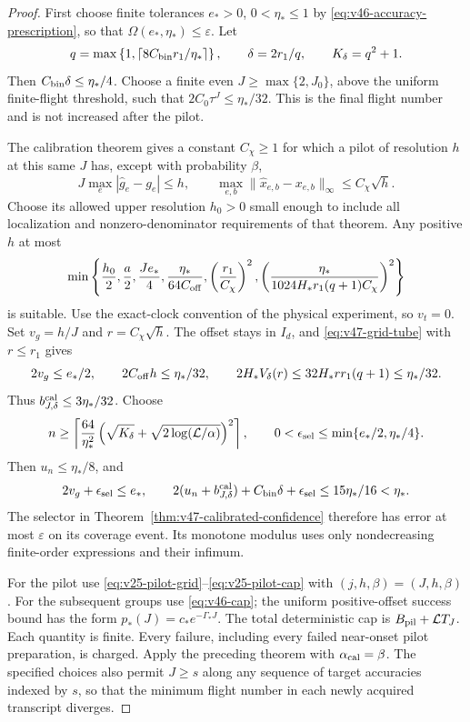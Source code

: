 \begin{proof}
First choose finite tolerances $e_*>0$, $0<\eta_*\le1$ by
\eqref{eq:v46-accuracy-prescription}, so that
$\Omega(e_*,\eta_*)\le\varepsilon$.  Let
\begin{equation}\label{eq:v47-grid-choice}
 q=\max\left\{1,\left\lceil8C_{\rm bin}r_1/\eta_*\right\rceil\right\},
 \qquad \delta=2r_1/q,\qquad K_\delta=q^2+1.
\end{equation}
Then $C_{\rm bin}\delta\le\eta_*/4$.  Choose a finite even
$J\ge\max\{2,J_0\}$, above the uniform finite-flight threshold, such that
$2C_0\tau^J\le\eta_*/32$.  This is the final flight number and is
not increased after the pilot.

The calibration theorem gives a constant $C_\chi\ge1$ for which a pilot
of resolution $h$ at this same $J$ has, except with probability $\beta$,
\[
 J\max_e|\widehat g_e-g_e|\le h,\qquad
 \max_{e,b}\|\widehat x_{e,b}-x_{e,b}\|_\infty\le C_\chi\sqrt h.
\]
Choose its allowed upper resolution $h_0>0$ small enough to include all
localization and nonzero-denominator requirements of that theorem.  Any
positive $h$ at most
\begin{equation}\label{eq:v47-pilot-choice}
 \min\left\{\frac{h_0}{2},\frac a2,\frac{Je_*}{4},
 \frac{\eta_*}{64C_{\rm off}},\left(\frac{r_1}{C_\chi}\right)^2,
 \left(\frac{\eta_*}{1024H_*r_1(q+1)C_\chi}\right)^2\right\}
\end{equation}
is suitable.  Use the exact-clock convention of the physical experiment,
so $v_t=0$.  Set $v_g=h/J$ and $r=C_\chi\sqrt h$.
The offset stays in $I_d$, and \eqref{eq:v47-grid-tube} with $r\le r_1$
gives
\[
 2v_g\le e_*/2,\qquad
 2C_{\rm off}h\le\eta_*/32,\qquad
 2H_*V_\delta(r)\le32H_*r r_1(q+1)\le\eta_*/32.
\]
Thus $b^{\rm cal}_{J,\delta}\le3\eta_*/32$.
Choose
\begin{equation}\label{eq:v47-sample-choice}
 n\ge\left\lceil\frac{64}{\eta_*^2}
       \left(\sqrt{K_\delta}+\sqrt{2\log(\mathcal L/\alpha)}\right)^2
       \right\rceil,
 \qquad 0<\epsilon_{\rm sel}\le\min\{e_*/2,\eta_*/4\}.
\end{equation}
Then $u_n\le\eta_*/8$, and
\[
 2v_g+\epsilon_{\rm sel}\le e_*,\qquad
 2(u_n+b^{\rm cal}_{J,\delta})+C_{\rm bin}\delta+
      \epsilon_{\rm sel}\le15\eta_*/16<\eta_*.
\]
The selector in Theorem~\ref{thm:v47-calibrated-confidence} therefore has
error at most $\varepsilon$ on its coverage event.  Its monotone modulus
uses only nondecreasing finite-order expressions and their infimum.

For the pilot use \eqref{eq:v25-pilot-grid}--\eqref{eq:v25-pilot-cap}
with $(j,h,\beta)=(J,h,\beta)$.  For the subsequent groups use
\eqref{eq:v46-cap}; the uniform positive-offset success bound has the form
$p_*(J)=c_*e^{-\Gamma_*J}$.  The total deterministic cap is
$B_{\rm pil}+\mathcal L T_J$.  Each quantity is finite.  Every failure,
including every failed near-onset pilot preparation, is charged.  Apply
the preceding theorem with $\alpha_{\rm cal}=\beta$.
The specified choices also permit $J\ge s$ along any sequence of target
accuracies indexed by $s$, so that the minimum flight number in each
newly acquired transcript diverges.
\end{proof}

